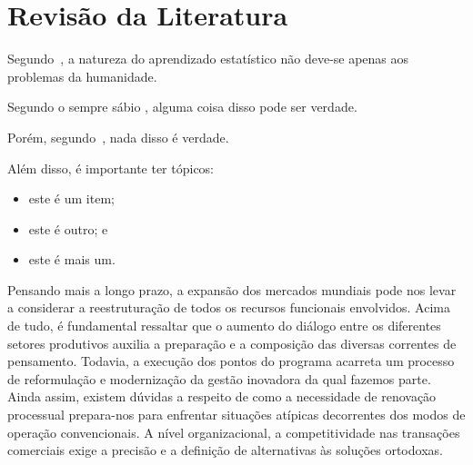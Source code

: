 \documentclass[font=plain,chapter=TITLE,section=Title,espaco=duplo,tocpage=plain,appendix=Name,floatnumber=continuous]{abnt}
\begin{document}
\chapter{Revisão da Literatura}

%
%
%
%
%
%
Segundo~\cite{joachims1998text}, a natureza do aprendizado estatístico não
deve-se apenas aos problemas da humanidade.

Segundo o sempre sábio ,
alguma coisa disso pode ser verdade.

Porém, segundo~\cite{vapnik2000nature}, nada disso é verdade.

Além disso, é importante ter tópicos:
\begin{itemize}
  \item este é um item;
  \item este é outro; e
  \item este é mais um.
\end{itemize}

Pensando mais a longo prazo, a expansão dos mercados mundiais pode nos
levar a considerar a reestruturação de todos os recursos funcionais
envolvidos. Acima de tudo, é fundamental ressaltar que o aumento do diálogo
entre os diferentes setores produtivos auxilia a preparação e a composição
das diversas correntes de pensamento. Todavia, a execução dos pontos do
programa acarreta um processo de reformulação e modernização da gestão
inovadora da qual fazemos parte. Ainda assim, existem dúvidas a respeito de
como a necessidade de renovação processual prepara-nos para enfrentar
situações atípicas decorrentes dos modos de operação convencionais. A nível
organizacional, a competitividade nas transações comerciais exige a
precisão e a definição de alternativas às soluções ortodoxas.
\end{document}

